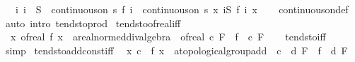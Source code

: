 \begin{isabellebody}
\ \ \ {\isachardoublequoteopen}{\isacharparenleft}{\kern0pt}{\isasymAnd}i{\isachardot}{\kern0pt}\ i\ {\isasymin}\ S\ {\isasymLongrightarrow}\ continuous{\isacharunderscore}{\kern0pt}on\ s\ {\isacharparenleft}{\kern0pt}f\ i{\isacharparenright}{\kern0pt}{\isacharparenright}{\kern0pt}\ {\isasymLongrightarrow}\ continuous{\isacharunderscore}{\kern0pt}on\ s\ {\isacharparenleft}{\kern0pt}{\isasymlambda}x{\isachardot}{\kern0pt}\ {\isasymProd}i{\isasymin}S{\isachardot}{\kern0pt}\ f\ i\ x{\isacharparenright}{\kern0pt}{\isachardoublequoteclose}\isanewline
%
\isadelimproof
\ \ %
\endisadelimproof
%
\isatagproof
{}\isamarkupfalse%
\ continuous{\isacharunderscore}{\kern0pt}on{\isacharunderscore}{\kern0pt}def\ \isamarkupfalse%
\ {\isacharparenleft}{\kern0pt}auto\ intro{\isacharcolon}{\kern0pt}\ tendsto{\isacharunderscore}{\kern0pt}prod{\isacharparenright}{\kern0pt}%
\endisatagproof
{\isafoldproof}%
%
\isadelimproof
\isanewline
%
\endisadelimproof
\isanewline
{}\isamarkupfalse%
\ tendsto{\isacharunderscore}{\kern0pt}of{\isacharunderscore}{\kern0pt}real{\isacharunderscore}{\kern0pt}iff{\isacharcolon}{\kern0pt}\isanewline
\ \ {\isachardoublequoteopen}{\isacharparenleft}{\kern0pt}{\isacharparenleft}{\kern0pt}{\isasymlambda}x{\isachardot}{\kern0pt}\ of{\isacharunderscore}{\kern0pt}real\ {\isacharparenleft}{\kern0pt}f\ x{\isacharparenright}{\kern0pt}\ {\isacharcolon}{\kern0pt}{\isacharcolon}{\kern0pt}\ {\isacharprime}{\kern0pt}a{\isacharcolon}{\kern0pt}{\isacharcolon}{\kern0pt}real{\isacharunderscore}{\kern0pt}normed{\isacharunderscore}{\kern0pt}div{\isacharunderscore}{\kern0pt}algebra{\isacharparenright}{\kern0pt}\ {\isasymlonglongrightarrow}\ of{\isacharunderscore}{\kern0pt}real\ c{\isacharparenright}{\kern0pt}\ F\ {\isasymlongleftrightarrow}\ {\isacharparenleft}{\kern0pt}f\ {\isasymlonglongrightarrow}\ c{\isacharparenright}{\kern0pt}\ F{\isachardoublequoteclose}\isanewline
%
\isadelimproof
\ \ %
\endisadelimproof
%
\isatagproof
{}\isamarkupfalse%
\ tendsto{\isacharunderscore}{\kern0pt}iff\ \isamarkupfalse%
\ simp%
\endisatagproof
{\isafoldproof}%
%
\isadelimproof
\isanewline
%
\endisadelimproof
\isanewline
{}\isamarkupfalse%
\ tendsto{\isacharunderscore}{\kern0pt}add{\isacharunderscore}{\kern0pt}const{\isacharunderscore}{\kern0pt}iff{\isacharcolon}{\kern0pt}\isanewline
\ \ {\isachardoublequoteopen}{\isacharparenleft}{\kern0pt}{\isacharparenleft}{\kern0pt}{\isasymlambda}x{\isachardot}{\kern0pt}\ c\ {\isacharplus}{\kern0pt}\ f\ x\ {\isacharcolon}{\kern0pt}{\isacharcolon}{\kern0pt}\ {\isacharprime}{\kern0pt}a{\isacharcolon}{\kern0pt}{\isacharcolon}{\kern0pt}topological{\isacharunderscore}{\kern0pt}group{\isacharunderscore}{\kern0pt}add{\isacharparenright}{\kern0pt}\ {\isasymlonglongrightarrow}\ c\ {\isacharplus}{\kern0pt}\ d{\isacharparenright}{\kern0pt}\ F\ {\isasymlongleftrightarrow}\ {\isacharparenleft}{\kern0pt}f\ {\isasymlonglongrightarrow}\ d{\isacharparenright}{\kern0pt}\ F{\isachardoublequoteclose}\isanewline

\end{isabellebody}

